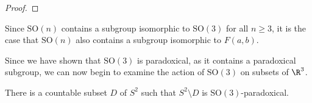 \begin{proof}
\end{proof}
\begin{remark}
  Since $\text{SO}(n)$ contains a subgroup isomorphic to $\text{SO}(3)$ for all $n\geq 3$, it is the case that $\text{SO}(n)$ also contains a subgroup isomorphic to $F(a,b)$.
\end{remark}
Since we have shown that $\text{SO}(3)$ is paradoxical, as it contains a paradoxical subgroup, we can now begin to examine the action of $\text{SO}(3)$ on subsets of $\R^3$.
\begin{theorem}
  There is a countable subset $D$ of $S^{2}$ such that $S^{2}\setminus D$ is $\text{SO}(3)$-paradoxical.
\end{theorem}
